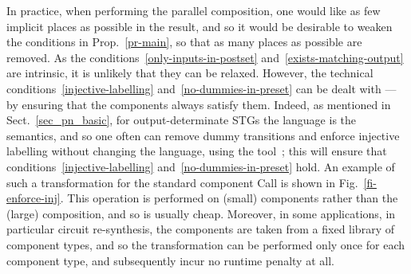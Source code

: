 In practice, when performing the parallel composition, one
would like as few implicit places as possible in the result,
and so it would be desirable to weaken the conditions in
Prop.~\ref{pr-main}, so that as many places as possible are
removed. As the conditions~\ref{only-inputs-in-postset}
and~\ref{exists-matching-output} are intrinsic, it is unlikely
that they can be relaxed. However, the technical
conditions~\ref{injective-labelling}
and~\ref{no-dummies-in-preset} can be dealt with --- by
ensuring that the components always satisfy them. Indeed, as
mentioned in Sect.~\ref{sec_pn_basic}, for output-determinate
STGs the language is the semantics, and so one often can remove
dummy transitions and enforce injective labelling without
changing the language, \eg using the \petrify
tool~\cite{ckkly97}; this will ensure that
conditions~\ref{injective-labelling}
and~\ref{no-dummies-in-preset} hold. An example of such a
transformation for the \balsa standard component Call is shown
in Fig.~\ref{fi-enforce-inj}. This operation is performed on
(small) components rather than the (large) composition, and so
is usually cheap. Moreover, in some applications, in particular
circuit re-synthesis, the components are taken from a fixed
library of component types, and so the transformation can be
performed only once for each component type, and subsequently
incur no runtime penalty at all.

